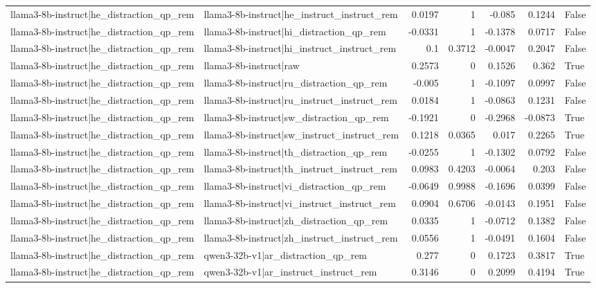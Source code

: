 \begin{table}
\begin{tabular}{l l r r r r l}
llama3-8b-instruct|he_distraction_qp_rem & llama3-8b-instruct|he_instruct_instruct_rem & 0.0197 & 1 & -0.085 & 0.1244 & False \\
llama3-8b-instruct|he_distraction_qp_rem & llama3-8b-instruct|hi_distraction_qp_rem & -0.0331 & 1 & -0.1378 & 0.0717 & False \\
llama3-8b-instruct|he_distraction_qp_rem & llama3-8b-instruct|hi_instruct_instruct_rem & 0.1 & 0.3712 & -0.0047 & 0.2047 & False \\
llama3-8b-instruct|he_distraction_qp_rem & llama3-8b-instruct|raw & 0.2573 & 0 & 0.1526 & 0.362 & True \\
llama3-8b-instruct|he_distraction_qp_rem & llama3-8b-instruct|ru_distraction_qp_rem & -0.005 & 1 & -0.1097 & 0.0997 & False \\
llama3-8b-instruct|he_distraction_qp_rem & llama3-8b-instruct|ru_instruct_instruct_rem & 0.0184 & 1 & -0.0863 & 0.1231 & False \\
llama3-8b-instruct|he_distraction_qp_rem & llama3-8b-instruct|sw_distraction_qp_rem & -0.1921 & 0 & -0.2968 & -0.0873 & True \\
llama3-8b-instruct|he_distraction_qp_rem & llama3-8b-instruct|sw_instruct_instruct_rem & 0.1218 & 0.0365 & 0.017 & 0.2265 & True \\
llama3-8b-instruct|he_distraction_qp_rem & llama3-8b-instruct|th_distraction_qp_rem & -0.0255 & 1 & -0.1302 & 0.0792 & False \\
llama3-8b-instruct|he_distraction_qp_rem & llama3-8b-instruct|th_instruct_instruct_rem & 0.0983 & 0.4203 & -0.0064 & 0.203 & False \\
llama3-8b-instruct|he_distraction_qp_rem & llama3-8b-instruct|vi_distraction_qp_rem & -0.0649 & 0.9988 & -0.1696 & 0.0399 & False \\
llama3-8b-instruct|he_distraction_qp_rem & llama3-8b-instruct|vi_instruct_instruct_rem & 0.0904 & 0.6706 & -0.0143 & 0.1951 & False \\
llama3-8b-instruct|he_distraction_qp_rem & llama3-8b-instruct|zh_distraction_qp_rem & 0.0335 & 1 & -0.0712 & 0.1382 & False \\
llama3-8b-instruct|he_distraction_qp_rem & llama3-8b-instruct|zh_instruct_instruct_rem & 0.0556 & 1 & -0.0491 & 0.1604 & False \\
llama3-8b-instruct|he_distraction_qp_rem & qwen3-32b-v1|ar_distraction_qp_rem & 0.277 & 0 & 0.1723 & 0.3817 & True \\
llama3-8b-instruct|he_distraction_qp_rem & qwen3-32b-v1|ar_instruct_instruct_rem & 0.3146 & 0 & 0.2099 & 0.4194 & True \\

\end{tabular}
\end{table}
